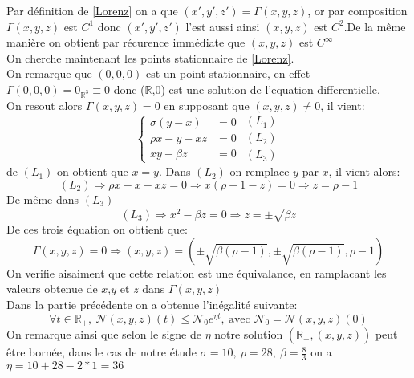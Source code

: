 \documentclass{article}
\newcommand{\R}{\mathbb{R}}
\begin{document}
Par définition de \eqref{Lorenz} on a que $(x',y',z') = \Gamma(x,y,z)$, or par composition $\Gamma(x,y,z)$ est $C^1$ donc $(x',y',z')$ l'est aussi ainsi $(x,y,z)$ est $C^2$.De la même manière on obtient par récurence immédiate que $(x,y,z)$ est $C^\infty$\\
On cherche maintenant les points stationnaire de \eqref{Lorenz}.\\
On remarque que $(0,0,0)$ est un point stationnaire, en effet $\Gamma(0,0,0) = 0_{\R^3} \equiv 0$ donc ($\R$,0) est une solution de l'equation differentielle.\\
On resout alors $\Gamma(x,y,z)=0$ en supposant que $(x,y,z) \neq 0$, il vient:
\[
\left\{\begin{array}{rl} %
     \sigma(y-x)&=0  \\
     \rho x -y -xz&=0\\
     xy - \beta z&=0
\end{array}\right.
\begin{array}{c} %
    (L_1)\\
    (L_2)\\
    (L_3)
\end{array}
\]
de $(L_1)$ on obtient que $x=y$. Dans $(L_2)$ on remplace $y$ par $x$, il vient alors:
\[
    (L_2) \Rightarrow \rho x - x - xz = 0 \Rightarrow x (\rho -1 -z ) = 0 \Rightarrow z = \rho -1
\]
De m\^eme dans $(L_3)$
\[
    (L_3) \Rightarrow x^2 - \beta z = 0 \Rightarrow z = \pm \sqrt{\beta z}
\]
De ces trois équation on obtient que:\[
    \Gamma(x,y,z)=0 \Rightarrow (x,y,z) = (\pm \sqrt{ \beta (\rho -1)} ,\pm \sqrt{\beta (\rho -1)}, \rho -1)   
\]
On verifie aisaiment que cette relation est une \'equivalance, en ramplacant les valeurs obtenue de $x$,$y$ et $z$ dans $\Gamma(x,y,z)$\\

Dans la partie précédente on a obtenue l'inégalité suivante:\[
    \forall t \in \R_+,\: \mathcal{N}(x,y,z)(t) \le \mathcal{N}_0 e^{\eta t},\: \textrm{avec } \mathcal{N}_0 = \mathcal{N}(x,y,z)(0)
\]
On remarque ainsi que selon le signe de $\eta$ notre solution $(\R_+,(x,y,z))$ peut être bornée, dans le cas de notre étude $\sigma = 10,\ \rho = 28,\ \beta = \frac{8}{3}$ on a $\eta = 10 + 28 - 2*1 = 36$
\end{document}
